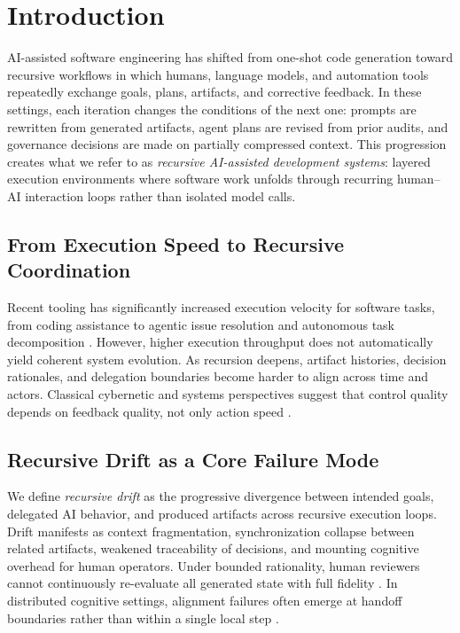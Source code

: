 \section{Introduction}
\label{sec:introduction}

AI-assisted software engineering has shifted from one-shot code generation toward recursive workflows in which humans, language models, and automation tools repeatedly exchange goals, plans, artifacts, and corrective feedback. In these settings, each iteration changes the conditions of the next one: prompts are rewritten from generated artifacts, agent plans are revised from prior audits, and governance decisions are made on partially compressed context. This progression creates what we refer to as \textit{recursive AI-assisted development systems}: layered execution environments where software work unfolds through recurring human--AI interaction loops rather than isolated model calls.

\subsection{From Execution Speed to Recursive Coordination}

Recent tooling has significantly increased execution velocity for software tasks, from coding assistance to agentic issue resolution and autonomous task decomposition \cite{Chen2021Codex,Jimenez2024SWEBench,Yang2024SWEAgent}. However, higher execution throughput does not automatically yield coherent system evolution. As recursion deepens, artifact histories, decision rationales, and delegation boundaries become harder to align across time and actors. Classical cybernetic and systems perspectives suggest that control quality depends on feedback quality, not only action speed \cite{Wiener1948Cybernetics,Beer1972BrainFirm}.

\subsection{Recursive Drift as a Core Failure Mode}

We define \textit{recursive drift} as the progressive divergence between intended goals, delegated AI behavior, and produced artifacts across recursive execution loops. Drift manifests as context fragmentation, synchronization collapse between related artifacts, weakened traceability of decisions, and mounting cognitive overhead for human operators. Under bounded rationality, human reviewers cannot continuously re-evaluate all generated state with full fidelity \cite{Simon1957ModelsMan,Sweller1988CognitiveLoad}. In distributed cognitive settings, alignment failures often emerge at handoff boundaries rather than within a single local step \cite{Hutchins1995CognitionWild}.

